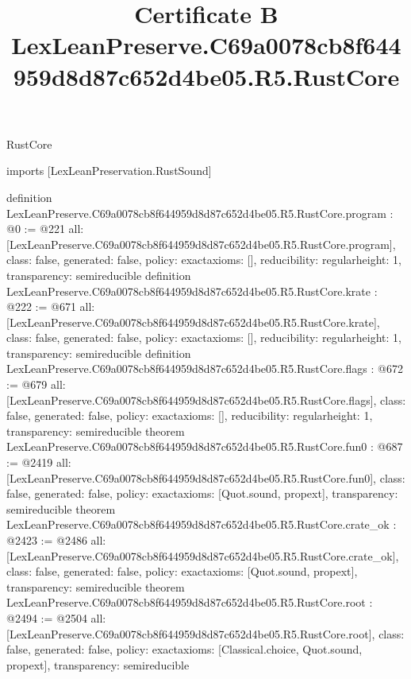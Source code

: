 \begin{lexlean}{RustCore}
\title{Certificate B LexLeanPreserve.C69a0078cb8f644959d8d87c652d4be05.R5.RustCore}
\begin{coremodule}
imports [LexLeanPreservation.RustSound]

definition LexLeanPreserve.C69a0078cb8f644959d8d87c652d4be05.R5.RustCore.program : @0 := @221 {
  all: [LexLeanPreserve.C69a0078cb8f644959d8d87c652d4be05.R5.RustCore.program],
  class: false,
  generated: false,
  policy: exact{axioms: []},
  reducibility: regular{height: 1},
  transparency: semireducible
}
definition LexLeanPreserve.C69a0078cb8f644959d8d87c652d4be05.R5.RustCore.krate : @222 := @671 {
  all: [LexLeanPreserve.C69a0078cb8f644959d8d87c652d4be05.R5.RustCore.krate],
  class: false,
  generated: false,
  policy: exact{axioms: []},
  reducibility: regular{height: 1},
  transparency: semireducible
}
definition LexLeanPreserve.C69a0078cb8f644959d8d87c652d4be05.R5.RustCore.flags : @672 := @679 {
  all: [LexLeanPreserve.C69a0078cb8f644959d8d87c652d4be05.R5.RustCore.flags],
  class: false,
  generated: false,
  policy: exact{axioms: []},
  reducibility: regular{height: 1},
  transparency: semireducible
}
theorem LexLeanPreserve.C69a0078cb8f644959d8d87c652d4be05.R5.RustCore.fun0 : @687 := @2419 {
  all: [LexLeanPreserve.C69a0078cb8f644959d8d87c652d4be05.R5.RustCore.fun0],
  class: false,
  generated: false,
  policy: exact{axioms: [Quot.sound, propext]},
  transparency: semireducible
}
theorem LexLeanPreserve.C69a0078cb8f644959d8d87c652d4be05.R5.RustCore.crate_ok : @2423 := @2486 {
  all: [LexLeanPreserve.C69a0078cb8f644959d8d87c652d4be05.R5.RustCore.crate_ok],
  class: false,
  generated: false,
  policy: exact{axioms: [Quot.sound, propext]},
  transparency: semireducible
}
theorem LexLeanPreserve.C69a0078cb8f644959d8d87c652d4be05.R5.RustCore.root : @2494 := @2504 {
  all: [LexLeanPreserve.C69a0078cb8f644959d8d87c652d4be05.R5.RustCore.root],
  class: false,
  generated: false,
  policy: exact{axioms: [Classical.choice, Quot.sound, propext]},
  transparency: semireducible
}


\end{coremodule}
\end{lexlean}
